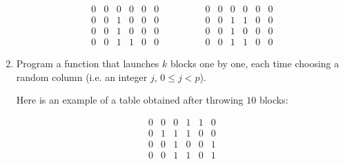\documentclass[11pt,class=report,crop=false]{standalone}
\begin{document}
\begin{activite}
\begin{enumerate}
$$\begin{array}{cccccc}
0&0&0&0&0&0\\
0&0&1&0&0&0\\
0&0&1&0&0&0\\
0&0&1&1&0&0
\end{array}\qquad\qquad
\begin{array}{cccccc}
0&0&0&0&0&0\\
0&0&1&1&0&0\\
0&0&1&0&0&0\\
0&0&1&1&0&0
\end{array}
$$
 

 
  \item Program a  function that launches 
  $k$ blocks one by one, each time choosing a random column (i.e. an integer $j$,  $0 \le j < p$). 
  
  Here is an example of a table obtained after throwing $10$ blocks:
  
 
\begin{center}
\begin{minipage}{0.3\textwidth} 
 $$\begin{array}{cccccc} 
0&0&0&1&1&0\\
0&1&1&1&0&0\\
0&0&1&0&0&1\\
0&0&1&1&0&1
\end{array}
$$
\end{minipage}
\begin{minipage}{0.4\textwidth} 
\end{minipage}
\end{center}  

\end{enumerate}

\end{activite}


\end{document}
